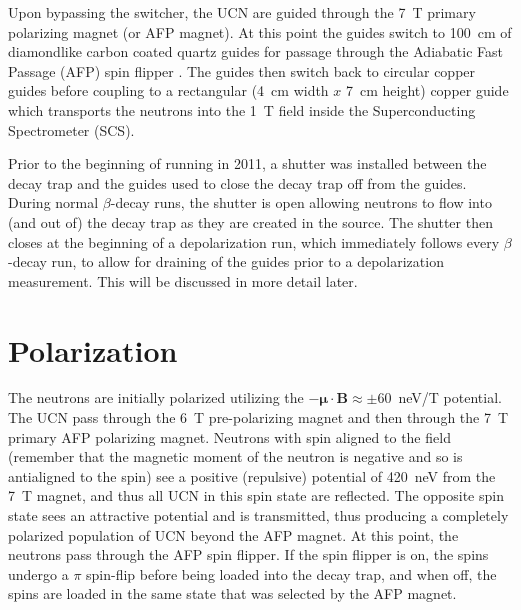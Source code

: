 Upon bypassing the switcher,
the UCN are guided through the 7~T primary polarizing magnet (or AFP magnet). At this point
the guides switch to 100~cm of diamondlike carbon coated quartz guides \cite{mammei2010thin}
for passage through the Adiabatic Fast Passage (AFP) spin flipper \cite{holley2012high}.
The guides then switch back to circular copper guides before coupling to a rectangular
(4~cm width $x$ 7~cm height) copper guide which transports the neutrons into the 1~T field
inside the Superconducting Spectrometer (SCS).

Prior to the beginning of running in 2011, a shutter was installed between the decay trap and
the guides used to close the decay trap off from the guides. During normal $\beta$-decay
runs, the shutter is open allowing neutrons to flow into (and out of) the decay trap as they are
created in the source. The shutter then closes at the beginning of a depolarization run, which immediately
follows every $\beta$-decay run, to allow for draining of the guides prior to a depolarization
measurement. This will be discussed in more detail later.

\section{Polarization}

The neutrons are initially polarized utilizing the $\boldsymbol{-\mu\cdot B} \approx \pm 60$~neV/T
potential. The UCN pass through the 6~T pre-polarizing magnet and then
through the 7~T primary AFP polarizing magnet. Neutrons with spin
aligned to the field (remember that the magnetic moment of the neutron is negative and so is antialigned
to the spin) see a positive (repulsive) potential of 420~neV from the 7~T magnet, and thus all
UCN in this spin state are reflected. The opposite spin state sees an attractive potential
and is transmitted, thus producing
a completely polarized population of UCN beyond the AFP magnet.
At this point, the neutrons pass through the AFP spin flipper. If the spin flipper is on, the spins
undergo a $\pi$ spin-flip before being loaded into the decay trap, and when off, the spins are
loaded in the same state that was selected by the AFP magnet.

